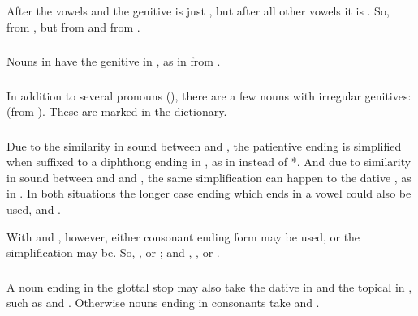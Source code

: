 \subsubsection{} After the vowels  and  the genitive is just
, but after all other vowels it is .  So, 
from , but  from  and 
from .

\subsubsection{} Nouns in  have the genitive in , as in
 from .

\subsubsection{} In addition to several pronouns
(), there are a few nouns with
irregular genitives:  (from ).  These are
marked in the dictionary.

\subsubsection{} Due to the similarity in sound between  and
, the patientive ending  is simplified when suffixed to a
diphthong ending in , as in   instead of
*.  And due to similarity in sound between  and and
, the same simplification can happen to the dative , as in
 .  In both situations the longer case
ending which ends in a vowel could also be used, 
and . 

With  and , however, either consonant ending form may be
used, or the simplification may be.  So, , 
or ; and , , or .

\subsubsection{} A noun ending in the glottal stop may also take the
dative in  and the topical in , such
as  and .  Otherwise nouns
ending in consonants take  and .

